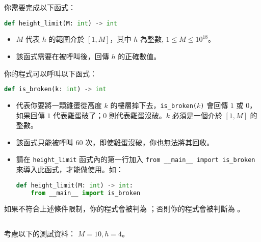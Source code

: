 \subsubsection*{}

你需要完成以下函式：

\begin{lstlisting}[language = python]
def height_limit(M: int) -> int
\end{lstlisting}

\begin{itemize}
    \item $M$ 代表 $h$ 的範圍介於 $[1,M]$，其中 $h$ 為整數, $1\le M\le 10^{18}$。
    \item 該函式需要在被呼叫後，回傳 $h$ 的正確數值。
\end{itemize}

你的程式可以呼叫以下函式：

\begin{lstlisting}[language = python]
def is_broken(k: int) -> int
\end{lstlisting}

\begin{itemize}
    \item 代表你要將一顆雞蛋從高度 $k$ 的樓層摔下去，\texttt{is\_broken($k$)} 會回傳 $1$ 或 $0$，如果回傳 $1$ 代表雞蛋破了；$0$ 則代表雞蛋沒破。$k$ 必須是一個介於 $[1,M]$ 的整數。
    \item 該函式只能被呼叫 $60$ 次，即使雞蛋沒破，你也無法將其回收。
    \item 請在 \texttt{height\_limit} 函式內的第一行加入 \texttt{from \_\_main\_\_ import is\_broken} 來導入此函式，才能做使用。如：

\begin{lstlisting}[language = python]
def height_limit(M: int) -> int:
    from __main__ import is_broken
\end{lstlisting}
\end{itemize}

如果不符合上述條件限制，你的程式會被判為 ；否則你的程式會被判斷為 。

\subsection*{}
考慮以下的測試資料： $M=10, h=4$。

